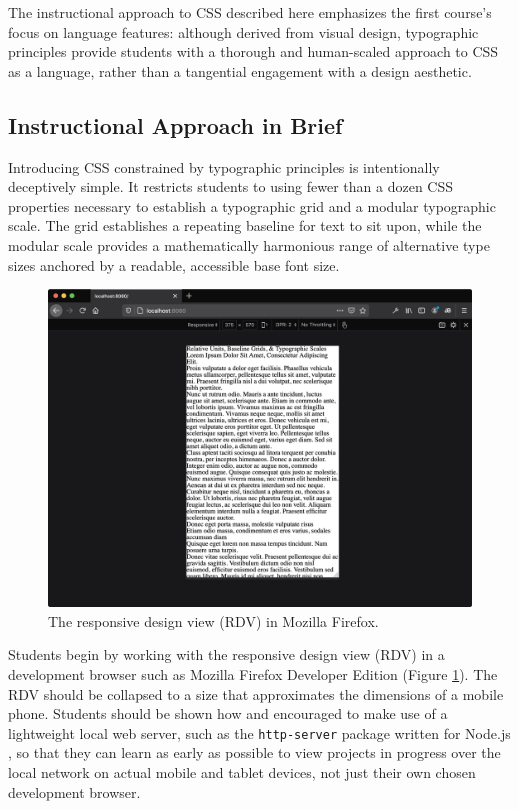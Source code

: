 \documentclass[sigplan,screen]{acmart}
\begin{document}
The instructional approach to CSS described here emphasizes the first course’s focus on language features: although derived from visual design, typographic principles provide students with a thorough and human-scaled approach to CSS as a language, rather than a tangential engagement with a design aesthetic.

\subsection{Instructional Approach in Brief}

Introducing CSS constrained by typographic principles is intentionally deceptively simple. It restricts students to using fewer than a dozen CSS properties necessary to establish a typographic grid and a modular typographic scale. The grid establishes a repeating baseline for text to sit upon, while the modular scale provides a mathematically harmonious range of alternative type sizes anchored by a readable, accessible base font size.

\begin{figure}
  \includegraphics[width=\linewidth]{rdv}
  \caption{The responsive design view (RDV) in Mozilla Firefox.}
  \label{fig:rdv}
\end{figure}

Students begin by working with the responsive design view (RDV) in a development browser such as Mozilla Firefox Developer Edition (Figure \ref{fig:rdv}). The RDV should be collapsed to a size that approximates the dimensions of a mobile phone. Students should be shown how and encouraged to make use of a lightweight local web server, such as the \verb|http-server| package written for Node.js \cite{npm:http}, so that they can learn as early as possible to view projects in progress over the local network on actual mobile and tablet devices, not just their own chosen development browser.
\end{document}
